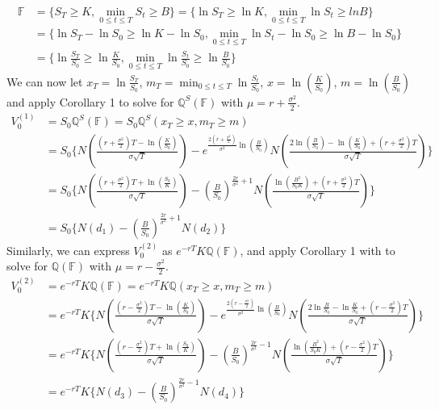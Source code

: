 \begin{equation*}
\begin{split}
\mathbb{F}
&= \{ S_{T} \ge K, \min_{0 \le t \le T} S_{t} \ge B \} = \{ \ln{S_{T}} \ge \ln{K}, \min_{0 \le t \le T} \ln{S_{t}} \ge ln{B} \}\\
&= \{ \ln{S_{T}} - \ln{S_{0}} \ge \ln{K} - \ln{S_{0}}, \min_{0 \le t \le T} \ln{S_{t}} - \ln{S_{0}} \ge \ln{B} - \ln{S_{0}} \}\\
&= \{ \ln{\frac{S_{T}}{S_{0}}} \ge \ln{\frac{K}{S_{0}}}, \min_{0 \le t \le T} \ln{\frac{S_{t}}{S_{0}}} \ge \ln{\frac{B}{S_{0}}} \}
\end{split}
\end{equation*}
We can now let $\displaystyle x_{T} = \ln{\frac{S_{T}}{S_{0}}}$, $\displaystyle m_{T} = \min_{0 \le t \le T} \ln{\frac{S_{t}}{S_{0}}}$, $\displaystyle x = \ln{(\frac{K}{S_{0}})}$, $\displaystyle m = \ln{(\frac{B}{S_{0}})}$\\[1mm]
and apply Corollary 1 to solve for $\mathbb{Q}^{S}(\mathbb{F})$ with $\mu = r + \frac{\sigma^{2}}{2}$.\\
\begin{equation*}
\begin{split}
V_{0}^{(1)}
&= S_{0}\mathbb{Q}^{S}({\mathbb{F}}) = S_{0}\mathbb{Q}^{S}(x_{T} \ge x, m_{T} \ge m)\\
&= S_{0}\{ N(\frac{(r+\frac{\sigma^{2}}{2})T - \ln{(\frac{K}{S_{0}})}}{\sigma \sqrt{T}}) - e^{\frac{2(r+\frac{\sigma^{2}}{2})}{\sigma^{2}}\ln{(\frac{B}{S_{0}})}} N(\frac{2\ln{(\frac{B}{S_{0}})} - \ln{(\frac{K}{S_{0}})} + (r + \frac{\sigma^{2}}{2})T}{\sigma \sqrt{T}}) \}\\
&= S_{0}\{ N(\frac{(r+\frac{\sigma^{2}}{2})T + \ln{(\frac{S_{0}}{K})}}{\sigma \sqrt{T}}) - {(\frac{B}{S_{0}})}^{\frac{2r}{\sigma^{2}}+1} N(\frac{\ln{(\frac{B^{2}}{S_{0}K})} + (r + \frac{\sigma^{2}}{2})T}{\sigma \sqrt{T}}) \}\\
&= S_{0}\{ N(d_{1}) - {(\frac{B}{S_{0}})}^{\frac{2r}{\sigma^{2}}+1} N(d_{2}) \}
\end{split}
\end{equation*}
\newpage
Similarly, we can express $V_{0}^{(2)}$ as $e^{-rT}K\mathbb{Q}({\mathbb{F}})$, and apply Corollary 1 with to solve for $\mathbb{Q}(\mathbb{F})$ with $\mu = r - \frac{\sigma^{2}}{2}$.\\
\begin{equation*}
\begin{split}
V_{0}^{(2)}
&= e^{-rT}K\mathbb{Q}({\mathbb{F}}) = e^{-rT}K\mathbb{Q}(x_{T} \ge x, m_{T} \ge m)\\
&= e^{-rT}K\{ N(\frac{(r-\frac{\sigma^{2}}{2})T - \ln{(\frac{K}{S_{0}})}}{\sigma \sqrt{T}}) - e^{\frac{2(r-\frac{\sigma^{2}}{2})}{\sigma^{2}}\ln{{(\frac{B}{S_{0}})}}} N(\frac{2\ln{\frac{B}{S_{0}} - \ln{\frac{K}{S_{0}}} + (r - \frac{\sigma^{2}}{2})T}}{\sigma \sqrt{T}}) \}\\
&= e^{-rT}K\{ N(\frac{(r-\frac{\sigma^{2}}{2})T + \ln{(\frac{S_{0}}{K})}}{\sigma \sqrt{T}}) - {(\frac{B}{S_{0}})}^{\frac{2r}{\sigma^{2}}-1} N(\frac{\ln{(\frac{B^{2}}{S_{0}K})} + (r - \frac{\sigma^{2}}{2})T}{\sigma \sqrt{T}}) \}\\
&= e^{-rT}K\{ N(d_{3}) - {(\frac{B}{S_{0}})}^{\frac{2r}{\sigma^{2}}-1} N(d_{4}) \}
\end{split}
\end{equation*}
